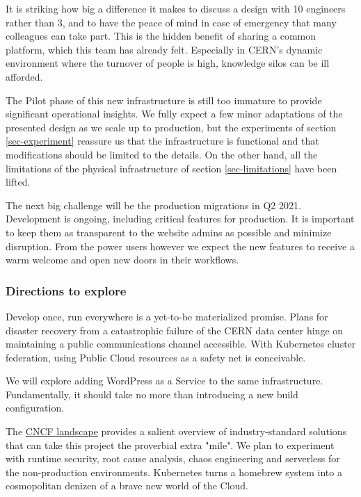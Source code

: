 It is striking how big a difference it makes to discuss a design with 10 engineers rather than 3, and to have the peace of mind in case of emergency that many colleagues can take part.
This is the hidden benefit of sharing a common platform, which this team has already felt.
Especially in CERN's dynamic environment where the turnover of people is high, knowledge silos can be ill afforded.

The Pilot phase of this new infrastructure is still too immature to provide significant operational insights.
We fully expect a few minor adaptations of the presented design as we scale up to production, but the experiments of
section \ref{sec-experiment} reassure us that the infrastructure is functional and that modifications should be limited to the details.
On the other hand, all the limitations of the physical infrastructure of section \ref{sec-limitations} have been lifted.

The next big challenge will be the production migrations in Q2 2021.
Development is ongoing, including critical features for production.
It is important to keep them as transparent to the website admins as possible and minimize disruption.
From the power users however we expect the new features to receive a warm welcome and open new doors in their workflows.

\subsubsection*{Directions to explore}

Develop once, run everywhere is a yet-to-be materialized promise.
Plans for disaster recovery from a catastrophic failure of the CERN data center hinge on maintaining a public communications channel accessible.
With Kubernetes cluster federation, using Public Cloud resources as a safety net is conceivable.

We will explore adding WordPress as a Service to the same infrastructure.
Fundamentally, it should take no more than introducing a new build configuration.

The \href{https://landscape.cncf.io/}{CNCF landscape} provides a salient overview of industry-standard solutions that can take this project the proverbial extra "mile".
We plan to experiment with runtime security, root cause analysis, chaos engineering and serverless for the non-production environments.
Kubernetes turns a homebrew system into a cosmopolitan denizen of a brave new world of the Cloud.